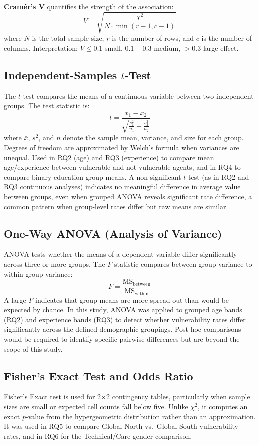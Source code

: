 \documentclass[conference]{IEEEtran}
\begin{document}
\textbf{Cram\'{e}r's V} quantifies the strength of the association:
\[
V = \sqrt{\frac{\chi^2}{N \cdot \min(r-1, c-1)}}
\]
where $N$ is the total sample size, $r$ is the number of rows, and $c$ is the number of columns. 
Interpretation: $V \leq 0.1$ small, $0.1{-}0.3$ medium, $> 0.3$ large effect.
 
\subsection{Independent-Samples $t$-Test}
The $t$-test compares the means of a continuous variable between two independent groups. 
The test statistic is:
\[
t = \frac{\bar{x}_1 - \bar{x}_2}{\sqrt{\frac{s_1^2}{n_1} + \frac{s_2^2}{n_2}}}
\]
where $\bar{x}$, $s^2$, and $n$ denote the sample mean, variance, and size for each group. 
Degrees of freedom are approximated by Welch's formula when variances are unequal. Used in RQ2 (age) and RQ3 (experience) to compare mean age/experience between vulnerable and not-vulnerable agents, and in RQ4 to compare binary education group means. 
A non-significant $t$-test (as in RQ2 and RQ3 continuous analyses) indicates no meaningful difference in average value between groups, even when grouped ANOVA reveals significant rate difference, a common pattern when group-level rates differ but raw means are similar.
 
\subsection{One-Way ANOVA (Analysis of Variance)}
ANOVA tests whether the means of a dependent variable differ significantly across three or more groups. 
The $F$-statistic compares between-group variance to within-group variance:
\[
F = \frac{\text{MS}_{\text{between}}}{\text{MS}_{\text{within}}}
\]
A large $F$ indicates that group means are more spread out than would be expected by chance. 
In this study, ANOVA was applied to grouped age bands (RQ2) and experience bands (RQ3) to detect whether vulnerability rates differ significantly across the defined demographic groupings. 
Post-hoc comparisons would be required to identify specific pairwise differences but are beyond the scope of this study.
 
\subsection{Fisher's Exact Test and Odds Ratio}
Fisher's Exact test is used for 2$\times$2 contingency tables, particularly when sample sizes are small or expected cell counts fall below five. 
Unlike $\chi^2$, it computes an exact $p$-value from the hypergeometric distribution rather than an approximation. 
It was used in RQ5 to compare Global North vs.\ Global South vulnerability rates, and in RQ6 for the Technical/Care gender comparison.
 
\end{document}

